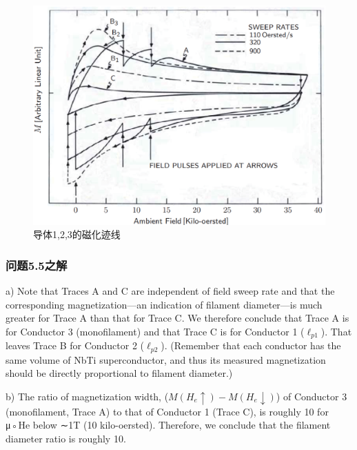 \begin{figure}
	\centering
	\includegraphics[scale=0.4]{chpt5/figs/fig5.21.eps}
	\caption{导体1,2,3的磁化迹线}
\end{figure}


\subsubsection{问题5.5之解}
a) Note that Traces A and C are independent of field sweep rate and that the
corresponding magnetization—an indication of filament diameter—is much greater
for Trace A than that for Trace C. We therefore conclude that Trace A is for
Conductor 3 (monofilament) and that Trace C is for Conductor 1 ($\ell_{p1}$). That
leaves Trace B for Conductor 2 ($\ell_{p2}$). (Remember that each conductor has the
same volume of NbTi superconductor, and thus its measured magnetization should
be directly proportional to filament diameter.)

b) The ratio of magnetization width, ($M(H_e\uparrow) − M(H_e\downarrow)$) of Conductor 3
(monofilament, Trace A) to that of Conductor 1 (Trace C), is roughly 10 for μ◦He
below ∼1T (10 kilo-oersted). Therefore, we conclude that the filament diameter
ratio is roughly 10.


